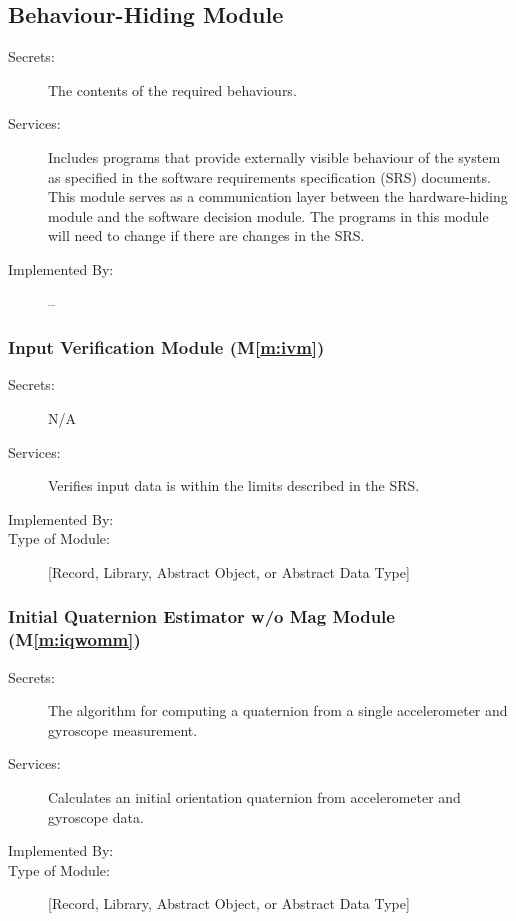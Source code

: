 \documentclass[12pt, titlepage]{article}
\newcommand{\mref}[1]{M\ref{#1}}
\begin{document}
\subsection{Behaviour-Hiding Module}

\begin{description}
\item[Secrets:]The contents of the required behaviours.
\item[Services:]Includes programs that provide externally visible behaviour of the system as
  specified in the software requirements specification (SRS) documents. This module serves as a
  communication layer between the hardware-hiding module and the software decision module. The
  programs in this module will need to change if there are changes in the SRS.
\item[Implemented By:] --
\end{description}

\subsubsection{Input Verification Module (\mref{m:ivm})}

\begin{description}
\item[Secrets:] N/A
\item[Services:] Verifies input data is within the limits described in the SRS.
\item[Implemented By:] \progname
\item[Type of Module:] [Record, Library, Abstract Object, or Abstract Data Type]
\end{description}

\subsubsection{Initial Quaternion Estimator w/o Mag Module (\mref{m:iqwomm})}

\begin{description}
\item[Secrets:] The algorithm for computing a quaternion from a single accelerometer and gyroscope measurement.
\item[Services:] Calculates an initial orientation quaternion from accelerometer and gyroscope data.
\item[Implemented By:] \progname
\item[Type of Module:] [Record, Library, Abstract Object, or Abstract Data Type]
\end{description}
\end{document}
